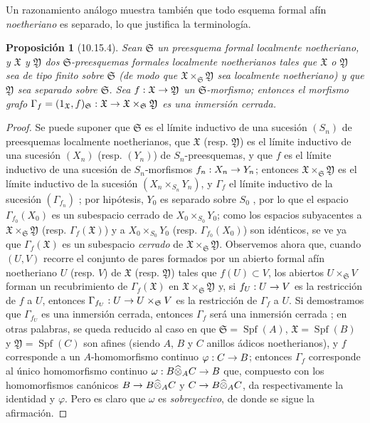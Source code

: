 \documentclass[oneside]{amsart}
\theoremstyle{ega-env-style}
\theoremstyle{ega-thm-env-style}
\newtheorem*{proposition}{Proposición}
\theoremstyle{ega-defn-env-style}
\renewcommand{\to}{\mathchoice{\longrightarrow}{\rightarrow}{\rightarrow}{\rightarrow}}
\let\EGAOriginalLabel\label
\renewcommand{\label}[1]{\phantomsection\EGAOriginalLabel{#1}}
\begin{document}
Un razonamiento análogo muestra también que todo esquema formal afín \emph{noetheriano} es separado, lo que justifica la terminología.

\begin{proposition}[10.15.4]
\label{I.10.15.4}
Sean $\mathfrak{S}$ un preesquema formal localmente noetheriano, y $\mathfrak{X}$ y $\mathfrak{Y}$ dos $\mathfrak{S}$-preesquemas formales localmente noetherianos tales que $\mathfrak{X}$ o $\mathfrak{Y}$ sea de tipo finito sobre $\mathfrak{S}$ (de modo que $\mathfrak{X}\times_{\mathfrak{S}}\mathfrak{Y}$ sea localmente noetheriano) y que $\mathfrak{Y}$ sea separado sobre $\mathfrak{S}$.
Sea $f:\mathfrak{X}\to\mathfrak{Y}$ un $\mathfrak{S}$-morfismo; entonces el morfismo grafo $\Gamma_f=(1_{\mathfrak{X}},f)_{\mathfrak{S}}:\mathfrak{X}\to
\mathfrak{X}\times_{\mathfrak{S}}\mathfrak{Y}$ es una inmersión cerrada.
\end{proposition}

\begin{proof}
Se puede suponer que $\mathfrak{S}$ es el límite inductivo de una sucesión $(S_n)$ de preesquemas localmente noetherianos, que $\mathfrak{X}$ (resp. $\mathfrak{Y}$) es el límite inductivo de una sucesión $(X_n)$ (resp. $(Y_n)$) de $S_n$-preesquemas, y que $f$ es el límite inductivo de una sucesión de $S_n$-morfismos $f_n:X_n\to Y_n$;
entonces $\mathfrak{X}\times_{\mathfrak{S}}\mathfrak{Y}$ es el límite inductivo de la sucesión $(X_n\times_{S_n}Y_n)$, y $\Gamma_f$ el límite inductivo de la sucesión $(\Gamma_{f_n})$ ;
por hipótesis, $Y_0$ es separado sobre $S_0$ , por lo que el espacio $\Gamma_{f_0}(X_0)$ es un subespacio cerrado de $X_0\times_{S_0}Y_0$;
como los espacios subyacentes a $\mathfrak{X}\times_{\mathfrak{S}}\mathfrak{Y}$ (resp. $\Gamma_f(\mathfrak{X})$) y a $X_0\times_{S_0}Y_0$ (resp. $\Gamma_{f_0}(X_0)$) son idénticos, se ve ya que $\Gamma_f(\mathfrak{X})$ es un subespacio \emph{cerrado} de $\mathfrak{X}\times_{\mathfrak{S}}\mathfrak{Y}$.
Observemos ahora que, cuando $(U,V)$ recorre el conjunto de pares formados por un abierto formal afín noetheriano $U$ (resp. $V$) de $\mathfrak{X}$ (resp. $\mathfrak{Y}$) tales que $f(U)\subset V$, los abiertos $U\times_{\mathfrak{S}}V$ forman un recubrimiento de $\Gamma_f(\mathfrak{X})$ en $\mathfrak{X}\times_{\mathfrak{S}}\mathfrak{Y}$ y, si $f_U:U\to V$ es la restricción de $f$ a $U$, entonces $\Gamma_{f_U}:U\to U\times_{\mathfrak{S}}V$ es la restricción de $\Gamma_f$ a $U$.
Si demostramos que $\Gamma_{f_U}$ es una inmersión cerrada, entonces $\Gamma_f$ será una inmersión cerrada ; en otras palabras, se queda reducido al caso en que $\mathfrak{S}=\operatorname{Spf}(A)$, $\mathfrak{X}=\operatorname{Spf}(B)$ y $\mathfrak{Y}=\operatorname{Spf}(C)$ son afines (siendo $A$, $B$ y $C$ anillos ádicos noetherianos), y $f$ corresponde a un $A$-homomorfismo continuo $\varphi:C\to B$;
entonces $\Gamma_f$ corresponde al único homomorfismo continuo $\omega:B\widehat{\otimes}_A C\to B$ que, compuesto con los homomorfismos canónicos $B\to B\widehat{\otimes}_A C$ y $C\to B\widehat{\otimes}_A C$, da respectivamente la identidad y $\varphi$.
Pero es claro que $\omega$ es \emph{sobreyectivo}, de donde se sigue la afirmación.
\end{proof}
\end{document}
